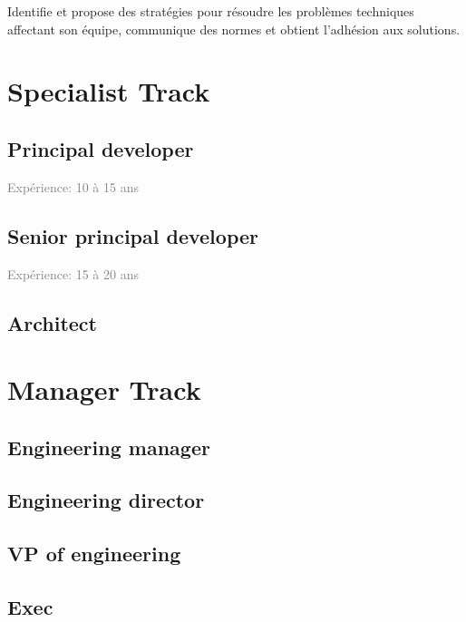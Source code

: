 \documentclass[a4paper, french, openany, 12pt]{book}
\newcommand\xp[1]{\textcolor{Gray}{Expérience: {#1} ans}}
\begin{document}
Identifie et propose des stratégies pour résoudre les problèmes techniques affectant son équipe, communique des normes 
et obtient l'adhésion aux solutions.

\part{Specialist Track}

\chapter{Principal developer}

\xp{10 à 15}

\chapter{Senior principal developer}

\xp{15 à 20}

\chapter{Architect}

\part{Manager Track}

\chapter{Engineering manager}

\chapter{Engineering director}

\chapter{VP of engineering}

\chapter{Exec}

\backmatter

\tableofcontents
\end{document}
